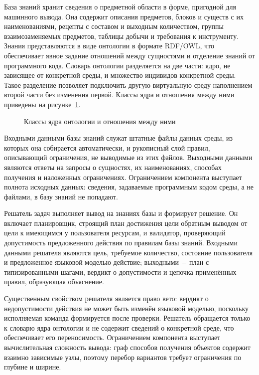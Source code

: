 База знаний хранит сведения о предметной области в форме, пригодной для
машинного вывода. Она содержит описания предметов, блоков и существ с их
наименованиями, рецепты с составом и выходным количеством, группы взаимозаменяемых
предметов, таблицы добычи и требования к инструменту. Знания представляются в виде
онтологии в формате RDF/OWL, что обеспечивает явное задание отношений между
сущностями и отделение знаний от программного кода. Словарь онтологии разделяется
на две части: ядро, не зависящее от конкретной среды, и множество индивидов
конкретной среды. Такое разделение позволяет подключить другую виртуальную среду
наполнением второй части без изменения первой. Классы ядра и отношения между ними
приведены на рисунке~\ref{fig:ontology}.

\begin{figure}[!htb]
  \centering
  
  \caption{Классы ядра онтологии и отношения между ними}
  \label{fig:ontology}
\end{figure}

Входными данными базы знаний служат штатные файлы данных среды, из которых она
собирается автоматически, и рукописный слой правил, описывающий ограничения,
не выводимые из этих файлов. Выходными данными являются ответы на запросы о
сущностях, их наименованиях, способах получения и наложенных ограничениях.
Ограничением компонента выступает полнота исходных данных: сведения, задаваемые
программным кодом среды, а не файлами, в базу знаний не попадают.

Решатель задач выполняет вывод на знаниях базы и формирует решение. Он включает
планировщик, строящий план достижения цели обратным выводом от цели к имеющимся
у пользователя ресурсам, и валидатор, проверяющий допустимость предложенного
действия по правилам базы знаний. Входными данными решателя являются цель,
требуемое количество, состояние пользователя и предложенное языковой моделью
действие; выходными~--~план с типизированными шагами, вердикт о допустимости и
цепочка применённых правил, образующая объяснение.

Существенным свойством решателя является право вето: вердикт о недопустимости
действия не может быть изменён языковой моделью, поскольку исполняемая команда
формируется после проверки. Решатель обращается только к словарю ядра онтологии и
не содержит сведений о конкретной среде, что обеспечивает его переносимость.
Ограничением компонента выступает вычислительная сложность вывода: граф способов
получения объектов содержит взаимно зависимые узлы, поэтому перебор вариантов
требует ограничения по глубине и ширине.

